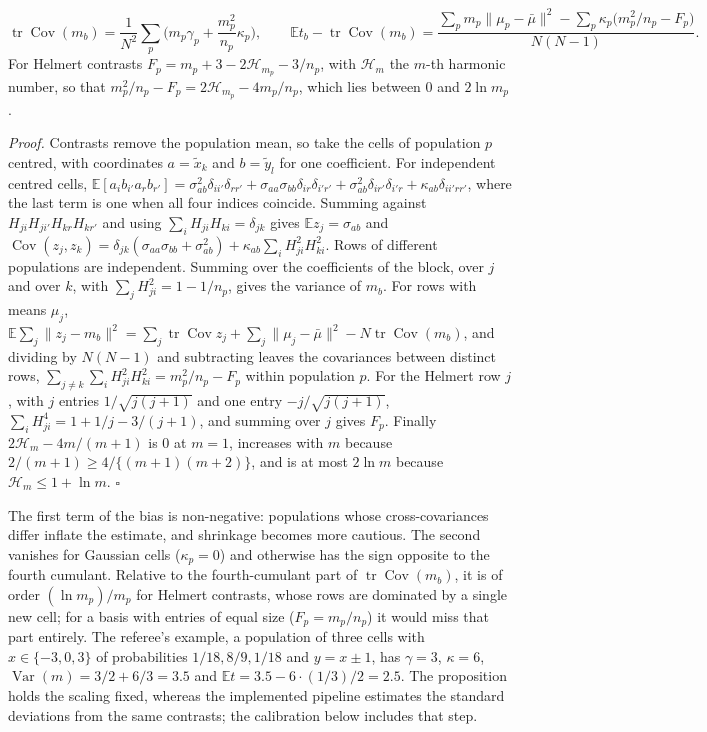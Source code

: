 \begin{proposition}\label{prop:contrast}
\[
\operatorname{tr}\operatorname{Cov}(m_b)=\frac{1}{N^2}\sum_p\Big(m_p\gamma_p+\frac{m_p^2}{n_p}\kappa_p\Big),\qquad
\mathbb{E}t_b-\operatorname{tr}\operatorname{Cov}(m_b)=\frac{\sum_pm_p\|\mu_p-\bar\mu\|^2-\sum_p\kappa_p\big(m_p^2/n_p-F_p\big)}{N(N-1)} .
\]
For Helmert contrasts $F_p=m_p+3-2\mathcal H_{m_p}-3/n_p$, with $\mathcal H_m$ the $m$-th harmonic number, so that $m_p^2/n_p-F_p=2\mathcal H_{m_p}-4m_p/n_p$, which lies between 0 and $2\ln m_p$.
\end{proposition}
\noindent\textit{Proof.} Contrasts remove the population mean, so take the cells of population $p$ centred, with coordinates $a=\tilde x_k$ and $b=\tilde y_l$ for one coefficient. For independent centred cells, $\mathbb{E}[a_ib_{i'}a_{r}b_{r'}]=\sigma_{ab}^2\delta_{ii'}\delta_{rr'}+\sigma_{aa}\sigma_{bb}\delta_{ir}\delta_{i'r'}+\sigma_{ab}^2\delta_{ir'}\delta_{i'r}+\kappa_{ab}\delta_{ii'rr'}$, where the last term is one when all four indices coincide. Summing against $H_{ji}H_{ji'}H_{kr}H_{kr'}$ and using $\sum_iH_{ji}H_{ki}=\delta_{jk}$ gives $\mathbb{E}z_j=\sigma_{ab}$ and $\operatorname{Cov}(z_j,z_k)=\delta_{jk}(\sigma_{aa}\sigma_{bb}+\sigma_{ab}^2)+\kappa_{ab}\sum_iH_{ji}^2H_{ki}^2$. Rows of different populations are independent. Summing over the coefficients of the block, over $j$ and over $k$, with $\sum_jH_{ji}^2=1-1/n_p$, gives the variance of $m_b$. For rows with means $\mu_j$, $\mathbb{E}\sum_j\|z_j-m_b\|^2=\sum_j\operatorname{tr}\operatorname{Cov}z_j+\sum_j\|\mu_j-\bar\mu\|^2-N\operatorname{tr}\operatorname{Cov}(m_b)$, and dividing by $N(N-1)$ and subtracting leaves the covariances between distinct rows, $\sum_{j\ne k}\sum_iH_{ji}^2H_{ki}^2=m_p^2/n_p-F_p$ within population $p$. For the Helmert row $j$, with $j$ entries $1/\sqrt{j(j+1)}$ and one entry $-j/\sqrt{j(j+1)}$, $\sum_iH_{ji}^4=1+1/j-3/(j+1)$, and summing over $j$ gives $F_p$. Finally $2\mathcal H_m-4m/(m+1)$ is 0 at $m=1$, increases with $m$ because $2/(m+1)\ge4/\{(m+1)(m+2)\}$, and is at most $2\ln m$ because $\mathcal H_m\le1+\ln m$. $\square$

The first term of the bias is non-negative: populations whose cross-covariances differ inflate the estimate, and shrinkage becomes more cautious. The second vanishes for Gaussian cells ($\kappa_p=0$) and otherwise has the sign opposite to the fourth cumulant. Relative to the fourth-cumulant part of $\operatorname{tr}\operatorname{Cov}(m_b)$, it is of order $(\ln m_p)/m_p$ for Helmert contrasts, whose rows are dominated by a single new cell; for a basis with entries of equal size ($F_p=m_p/n_p$) it would miss that part entirely. The referee's example, a population of three cells with $x\in\{-3,0,3\}$ of probabilities $1/18,8/9,1/18$ and $y=x\pm1$, has $\gamma=3$, $\kappa=6$, $\operatorname{Var}(m)=3/2+6/3=3.5$ and $\mathbb{E}t=3.5-6\cdot(1/3)/2=2.5$. The proposition holds the scaling fixed, whereas the implemented pipeline estimates the standard deviations from the same contrasts; the calibration below includes that step.

